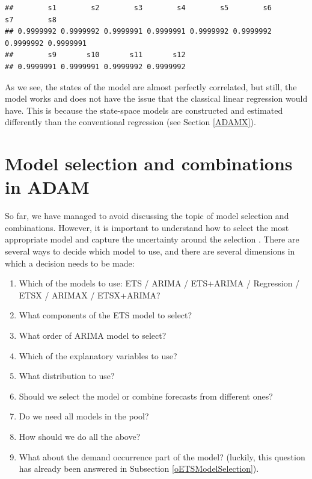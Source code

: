 \documentclass[]{book}
\newenvironment{Shaded}{\begin{snugshade}}{\end{snugshade}}
\newcommand{\CommentTok}[1]{\textcolor[rgb]{0.56,0.35,0.01}{\textit{#1}}}
\newcommand{\DecValTok}[1]{\textcolor[rgb]{0.00,0.00,0.81}{#1}}
\newcommand{\KeywordTok}[1]{\textcolor[rgb]{0.13,0.29,0.53}{\textbf{#1}}}
\newcommand{\NormalTok}[1]{#1}
\newcommand{\OperatorTok}[1]{\textcolor[rgb]{0.81,0.36,0.00}{\textbf{#1}}}
\newcommand{\StringTok}[1]{\textcolor[rgb]{0.31,0.60,0.02}{#1}}
\providecommand{\tightlist}{%
  \setlength{\itemsep}{0pt}\setlength{\parskip}{0pt}}
\theoremstyle{definition}
\theoremstyle{definition}
\theoremstyle{definition}
\theoremstyle{definition}
\theoremstyle{remark}
\begin{document}
\begin{Shaded}
\end{Shaded}

\begin{verbatim}
##        s1        s2        s3        s4        s5        s6        s7        s8 
## 0.9999992 0.9999992 0.9999991 0.9999991 0.9999992 0.9999992 0.9999992 0.9999991 
##        s9       s10       s11       s12 
## 0.9999991 0.9999991 0.9999992 0.9999992
\end{verbatim}

As we see, the states of the model are almost perfectly correlated, but still, the model works and does not have the issue that the classical linear regression would have. This is because the state-space models are constructed and estimated differently than the conventional regression (see Section \ref{ADAMX}).

\hypertarget{ADAMSelection}{%
\chapter{Model selection and combinations in ADAM}\label{ADAMSelection}}

So far, we have managed to avoid discussing the topic of model selection and combinations. However, it is important to understand how to select the most appropriate model and capture the uncertainty around the selection \citep[see discussion of sources of uncertainty in Section 1.3 of][]{SvetunkovSBA}. There are several ways to decide which model to use, and there are several dimensions in which a decision needs to be made:

\begin{enumerate}
\def\labelenumi{\arabic{enumi}.}
\tightlist
\item
  Which of the models to use: ETS / ARIMA / ETS+ARIMA / Regression / ETSX / ARIMAX / ETSX+ARIMA?
\item
  What components of the ETS model to select?
\item
  What order of ARIMA model to select?
\item
  Which of the explanatory variables to use?
\item
  What distribution to use?
\item
  Should we select the model or combine forecasts from different ones?
\item
  Do we need all models in the pool?
\item
  How should we do all the above?
\item
  What about the demand occurrence part of the model? (luckily, this question has already been answered in Subsection \ref{oETSModelSelection}).
\end{enumerate}
\end{document}
